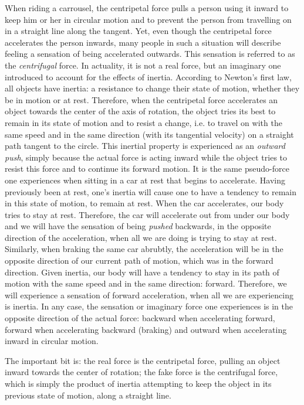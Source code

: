 When riding a carrousel, the centripetal force pulls a person using it inward to keep him or her in circular motion and to prevent the person from travelling on in a straight line along the tangent. Yet, even though the centripetal force accelerates the person inwards, many people in such a situation will describe feeling a sensation of being accelerated outwards. This sensation is referred to as the \emph{centrifugal} force. In actuality, it is not a real force, but an imaginary one introduced to account for the effects of inertia. According to Newton's first law, all objects have inertia: a resistance to change their state of motion, whether they be in motion or at rest. Therefore, when the centripetal force accelerates an object towards the center of the axis of rotation, the object tries its best to remain in its state of motion and to resist a change, i.e. to travel on with the same speed and in the same direction (with its tangential velocity) on a straight path tangent to the circle. This inertial property is experienced as an \emph{outward push}, simply because the actual force is acting inward while the object tries to resist this force and to continue its forward motion. It is the same pseudo-force one experiences when sitting in a car at rest that begins to accelerate. Having previously been at rest, one's inertia will cause one to have a tendency to remain in this state of motion, to remain at rest. When the car accelerates, our body tries to stay at rest. Therefore, the car will accelerate out from under our body and we will have the sensation of being \emph{pushed} backwards, in the opposite direction of the acceleration, when all we are doing is trying to stay at rest. Similarly, when braking the same car abrubtly, the acceleration will be in the opposite direction of our current path of motion, which was in the forward direction. Given inertia, our body will have a tendency to stay in its path of motion with the same speed and in the same direction: forward. Therefore, we will experience a sensation of forward acceleration, when all we are experiencing is inertia. In any case, the sensation or imaginary force one experiences is in the opposite direction of the actual force: backward when accelerating forward, forward when accelerating backward (braking) and outward when accelerating inward in circular motion. 

The important bit is: the real force is the centripetal force, pulling an object inward towards the center of rotation; the fake force is the centrifugal force, which is simply the product of inertia attempting to keep the object in its previous state of motion, along a straight line.

